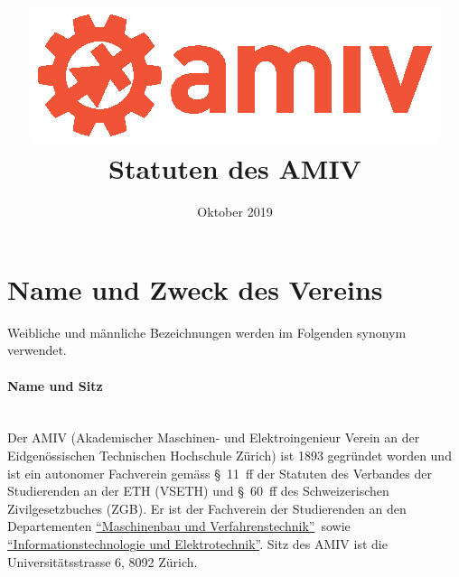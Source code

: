 \documentclass[a4paper,11pt]{article}
\title{\includegraphics[scale=1.5]{amiv-logo.eps} \\\vspace{1.8cm} Statuten des AMIV}
\date{Oktober 2019}
\begin{document}
\maketitle




\newcommand{\ITET}{\href{http://www.ee.ethz.ch/}{``Informationstechnologie und Elektrotechnik''}}
\newcommand{\MAVT}{\href{http://www.mavt.ethz.ch/}{``Maschinenbau und Verfahrenstechnik''}}





\section{Name und Zweck des Vereins}

Weibliche und männliche Bezeichnungen werden im Folgenden synonym verwendet.

\paragraph{Name und Sitz} \ \\
Der AMIV (Akademischer Maschinen- und Elektroingenieur Verein an der Eidgenössischen Technischen Hochschule Zürich) ist 1893 gegründet worden und ist ein autonomer Fachverein gemäss \mbox{§ 11 ff} der Statuten des Verbandes der Studierenden an der ETH (VSETH) und \mbox{§ 60 ff} des Schweizerischen Zivilgesetzbuches (ZGB). Er ist der Fachverein der Studierenden an den Departementen \MAVT\ sowie \ITET. Sitz des AMIV ist die Universitätsstrasse 6, 8092 Zürich.
\end{document}
